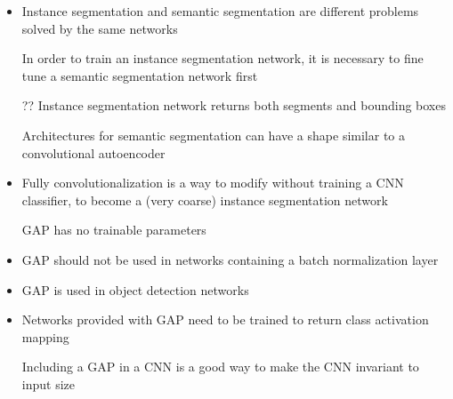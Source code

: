 
\begin{box-sol}
    \begin{itemize}[label=]
        \item Instance segmentation and semantic segmentation are different problems solved by the same networks
        \item[\ok] In order to train an instance segmentation network, it is necessary to fine tune a semantic segmentation network first
        \item[??] Instance segmentation network returns both segments and bounding boxes
        \item[\ok] Architectures for semantic segmentation can have a shape similar to a convolutional autoencoder
        \item Fully convolutionalization is a way to modify without training a CNN classifier, to become a (very coarse) instance segmentation network
    \end{itemize}
\end{box-sol}



\begin{box-sol}
    \begin{itemize}[label=]
        \item[\ok] GAP has no trainable parameters
        \item GAP should not be used in networks containing a batch normalization layer
        \item GAP is used in object detection networks
        \item Networks provided with GAP need to be trained to return class activation mapping
        \item[\ok] Including a GAP in a CNN is a good way to make the CNN invariant to input size
    \end{itemize}
\end{box-sol}




